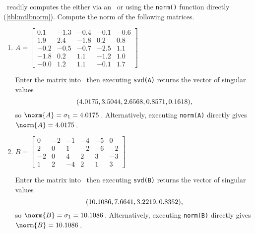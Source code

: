 \begin{example} \label{eg:}
\script\ readily computes the  either via an \svd\ or using the \verb|norm()| function directly (\autoref{tbl:mtlbnorm}).
Compute the norm of the following matrices.
\begin{enumerate}
\item \(A=\begin{bmatrix} 
   0.1&-1.3&-0.4&-0.1&-0.6\\
   1.9&2.4&-1.8&0.2&0.8\\
  -0.2&-0.5&-0.7&-2.5&1.1\\
  -1.8&0.2&1.1&-1.2&1.0\\
  -0.0&1.2&1.1&-0.1&1.7
 \end{bmatrix}\)
\begin{solution} 
Enter the matrix into \script\ then executing \verb|svd(A)| returns the vector of singular values
\setbox\ajrqrbox\hbox{}%
\marginpar{\usebox{\ajrqrbox\\[2ex]}}%
\begin{equation*}\sloppy
(4.0175,3.5044,2.6568,0.8571,0.1618),
\end{equation*}
so \(\norm{A}=\sigma_1=4.0175\)\,.
Alternatively, executing \verb|norm(A)| directly gives  \(\norm{A}=4.0175\)\,.
\end{solution}

\item \(B=\begin{bmatrix} 
0&-2&-1&-4&-5&0
\\2&0&1&-2&-6&-2
\\-2&0&4&2&3&-3
\\1&2&-4&2&1&3
\end{bmatrix}\)
\begin{solution} 
Enter the matrix into \script\ then executing \verb|svd(B)| returns the vector of singular values
\setbox\ajrqrbox\hbox{}%
\marginpar{\usebox{\ajrqrbox\\[2ex]}}%
\begin{equation*}\sloppy
(10.1086,7.6641,3.2219,0.8352),
\end{equation*}
so \(\norm{B}=\sigma_1=10.1086\)\,.
Alternatively, executing \verb|norm(B)| directly gives  \(\norm{B}=10.1086\)\,.
\end{solution}

\end{enumerate}
\end{example}










